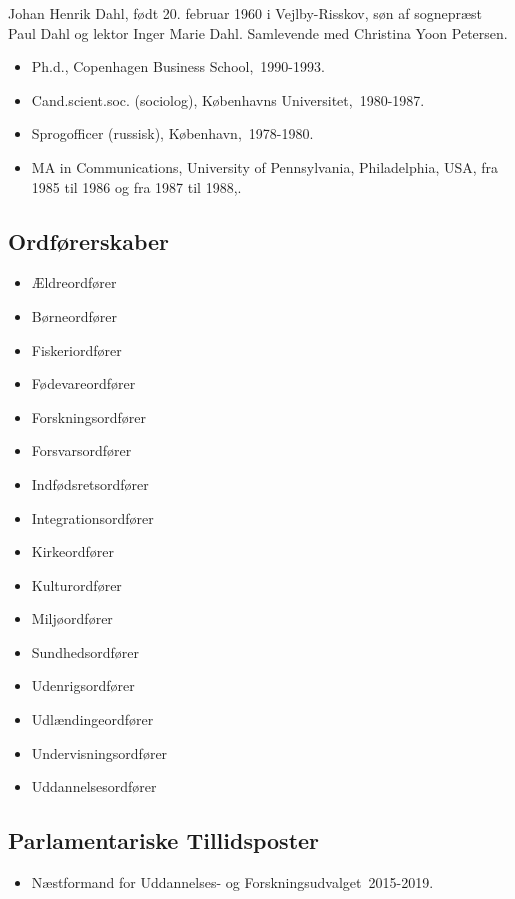 \documentclass[11pt, a4paper]{awesome-cv}
\begin{document}
\makecvheader[R]
\makelettertitle
\begin{cvletter}
Johan Henrik Dahl, født 20. februar 1960 i Vejlby-Risskov, søn af sognepræst Paul Dahl og lektor Inger Marie Dahl. Samlevende med Christina Yoon Petersen.

\begin{itemize}
\item Ph.d., Copenhagen Business School, 1990-1993.
\item Cand.scient.soc. (sociolog), Københavns Universitet, 1980-1987.
\item Sprogofficer (russisk), København, 1978-1980.
\item MA in Communications, University of Pennsylvania, Philadelphia, USA, fra 1985 til 1986 og fra 1987 til 1988,.
\end{itemize}
\subsection*{Ordførerskaber}
\begin{itemize}
\item Ældreordfører
\item Børneordfører
\item Fiskeriordfører
\item Fødevareordfører
\item Forskningsordfører
\item Forsvarsordfører
\item Indfødsretsordfører
\item Integrationsordfører
\item Kirkeordfører
\item Kulturordfører
\item Miljøordfører
\item Sundhedsordfører
\item Udenrigsordfører
\item Udlændingeordfører
\item Undervisningsordfører
\item Uddannelsesordfører
\end{itemize}
\subsection*{Parlamentariske Tillidsposter}
\begin{itemize}
\item Næstformand for Uddannelses- og Forskningsudvalget 2015-2019.
\end{itemize}

\end{cvletter}
\end{document}
